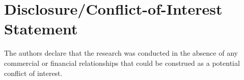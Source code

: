 \documentclass{frontiersSCNS} %
\begin{document}
\section*{Disclosure/Conflict-of-Interest Statement}
The authors declare that the research was conducted in the absence of any commercial or financial relationships that could be construed as a potential conflict of interest.









\end{document}
